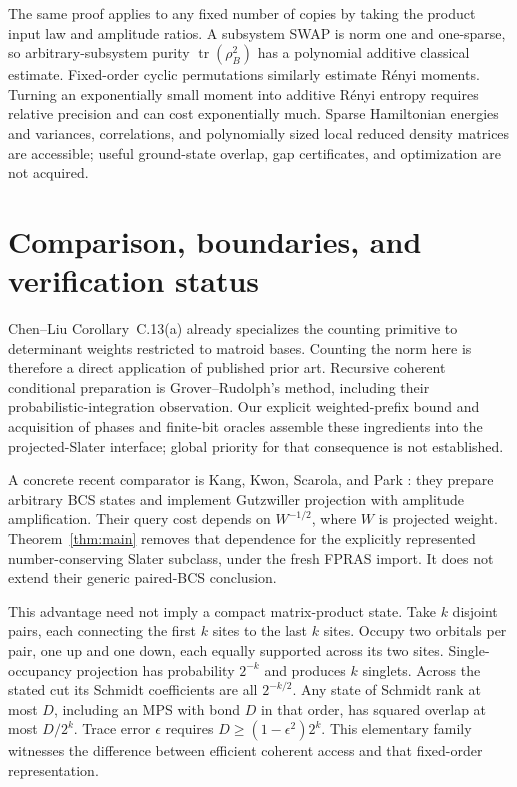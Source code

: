 \documentclass[11pt]{article}
\theoremstyle{remark}
\newcommand{\tr}{\operatorname{tr}}
\begin{document}
The same proof applies to any fixed number of copies by taking the product input law and amplitude ratios. A subsystem SWAP is norm one and one-sparse, so arbitrary-subsystem purity $\tr(\rho_B^2)$ has a polynomial additive classical estimate. Fixed-order cyclic permutations similarly estimate R\'{e}nyi moments. Turning an exponentially small moment into additive R\'{e}nyi entropy requires relative precision and can cost exponentially much. Sparse Hamiltonian energies and variances, correlations, and polynomially sized local reduced density matrices are accessible; useful ground-state overlap, gap certificates, and optimization are not acquired.

\section{Comparison, boundaries, and verification status}
Chen--Liu Corollary~C.13(a) already specializes the counting primitive to determinant weights restricted to matroid bases. Counting the norm here is therefore a direct application of published prior art. Recursive coherent conditional preparation is Grover--Rudolph's method, including their probabilistic-integration observation. Our explicit weighted-prefix bound and acquisition of phases and finite-bit oracles assemble these ingredients into the projected-Slater interface; global priority for that consequence is not established.

A concrete recent comparator is Kang, Kwon, Scarola, and Park \cite{Kang}: they prepare arbitrary BCS states and implement Gutzwiller projection with amplitude amplification. Their query cost depends on $W^{-1/2}$, where $W$ is projected weight. Theorem~\ref{thm:main} removes that dependence for the explicitly represented number-conserving Slater subclass, under the fresh FPRAS import. It does not extend their generic paired-BCS conclusion.

This advantage need not imply a compact matrix-product state. Take $k$ disjoint pairs, each connecting the first $k$ sites to the last $k$ sites. Occupy two orbitals per pair, one up and one down, each equally supported across its two sites. Single-occupancy projection has probability $2^{-k}$ and produces $k$ singlets. Across the stated cut its Schmidt coefficients are all $2^{-k/2}$. Any state of Schmidt rank at most $D$, including an MPS with bond $D$ in that order, has squared overlap at most $D/2^k$. Trace error $\epsilon$ requires $D\ge(1-\epsilon^2)2^k$. This elementary family witnesses the difference between efficient coherent access and that fixed-order representation.
\end{document}
